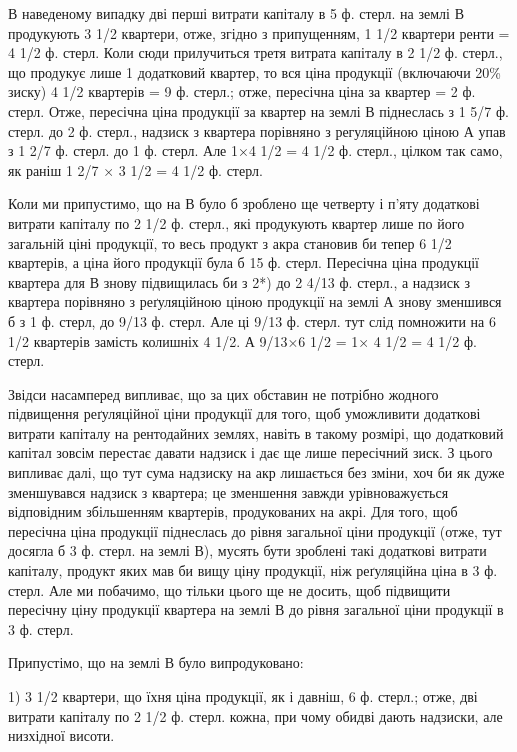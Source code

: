 В наведеному випадку дві перші витрати капіталу в 5 ф. стерл. на землі В
продукують 3 1/2 квартери, отже, згідно з припущенням, 1  1/2 квартери ренти =
4  1/2 ф. стерл. Коли сюди прилучиться третя витрата капіталу в 2 1/2 ф. стерл.,
що продукує лише 1 додатковий квартер, то вся ціна продукції (включаючи 20\%
зиску) 4  1/2 квартерів = 9 ф. стерл.; отже, пересічна ціна за квартер = 2 ф. стерл.
Отже, пересічна ціна продукції за квартер на землі В піднеслась з 1 5/7 ф. стерл.
до 2 ф. стерл., надзиск з квартера порівняно з регуляційною ціною А упав
з 1  2/7 ф. стерл. до 1 ф. стерл. Але 1×4  1/2 = 4  1/2 ф. стерл., цілком так само,
як раніш 1  2/7 × 3 1/2 = 4 1/2 ф. стерл.

Коли ми припустимо, що на В було б зроблено ще четверту і п’яту додаткові
витрати капіталу по 2  1/2 ф. стерл., які продукують квартер лише по його
загальній ціні продукції, то весь продукт з акра становив би тепер 6  1/2 квартерів,
а ціна його продукції була б 15 ф. стерл. Пересічна ціна продукції
квартера для В знову підвищилась би з 2*) до 2  4/13 ф. стерл., а надзиск з квартера
порівняно з реґуляційною ціною продукції на землі А знову зменшився
б з 1 ф. стерл, до 9/13 ф. стерл. Але ці 9/13 ф. стерл. тут слід
помножити на 6 1/2 квартерів замість колишніх 4 1/2. А 9/13×6 1/2 = 1× 4 1/2 = 4 1/2 ф. стерл.

Звідси насамперед випливає, що за цих обставин не потрібно жодного підвищення
реґуляційної ціни продукції для того, щоб уможливити додаткові витрати
капіталу на рентодайних землях, навіть в такому розмірі, що додатковий
капітал зовсім перестає давати надзиск і дає ще лише пересічний зиск. З
цього випливає далі, що тут сума надзиску на акр лишається без зміни,
хоч би як дуже зменшувався надзиск з квартера; це зменшення завжди урівноважується
відповідним збільшенням квартерів, продукованих на акрі. Для того,
щоб пересічна ціна продукції піднеслась до рівня загальної ціни продукції (отже,
тут досягла б 3 ф. стерл. на землі В), мусять бути зроблені такі додаткові витрати
капіталу, продукт яких мав би вищу ціну продукції, ніж реґуляційна ціна
в 3 ф. стерл. Але ми побачимо, що тільки цього ще не досить, щоб підвищити
пересічну ціну продукції квартера на землі В до рівня загальної ціни продукції
в 3 ф. стерл.

Припустімо, що на землі В було випродуковано:

1) 3 1/2 квартери, що їхня ціна продукції, як і давніш, 6 ф. стерл.; отже,
дві витрати капіталу по  2 1/2 ф. стерл. кожна, при чому обидві дають надзиски,
але низхідної висоти.

